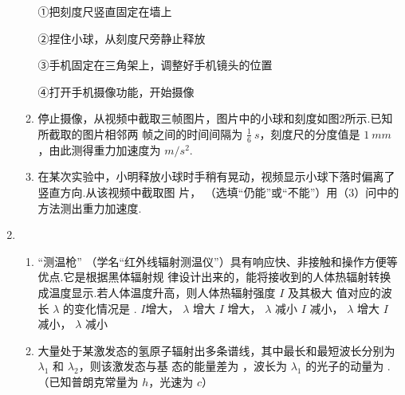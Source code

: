 \begin{enumerate}
\begin{enumerate}
①把刻度尺竖直固定在墙上

②捏住小球，从刻度尺旁静止释放

③手机固定在三角架上，调整好手机镜头的位置

④打开手机摄像功能，开始摄像

\item 
停止摄像，从视频中截取三帧图片，图片中的小球和刻度如图$ 2 $所示.已知所截取的图片相邻两
帧之间的时间间隔为 $ \frac{ 1 }{ 6 } \ s $，刻度尺的分度值是 $ 1 \ mm $，由此测得重力加速度为 \underlinegap $ m/s^{2} $.

\item 
在某次实验中，小明释放小球时手稍有晃动，视频显示小球下落时偏离了竖直方向.从该视频中截取图
片， \underlinegap （选填“仍能”或“不能”）用（$ 3 $）问中的方法测出重力加速度.

\end{enumerate}













\item 
\begin{enumerate}
\item
“测温枪”
（学名“红外线辐射测温仪”）具有响应快、非接触和操作方便等优点.它是根据黑体辐射规
律设计出来的，能将接收到的人体热辐射转换成温度显示.若人体温度升高，则人体热辐射强度 $ I $ 及其极大
值对应的波长 $ \lambda $ 的变化情况是 \underlinegap .
\fourchoices
{$ I $增大， $ \lambda $ 增大}
{$ I $ 增大， $ \lambda $ 减小}
{$ I $ 减小， $ \lambda $ 增大}
{$ I $ 减小， $ \lambda $ 减小}






\item 
大量处于某激发态的氢原子辐射出多条谱线，其中最长和最短波长分别为 $ \lambda_{1} $ 和 $ \lambda_{2} $，则该激发态与基
态的能量差为 \underlinegap ，波长为 $ \lambda_{1} $ 的光子的动量为 \underlinegap .（已知普朗克常量为 $ h $，光速为 $ c $）


\end{enumerate}
\end{enumerate}
